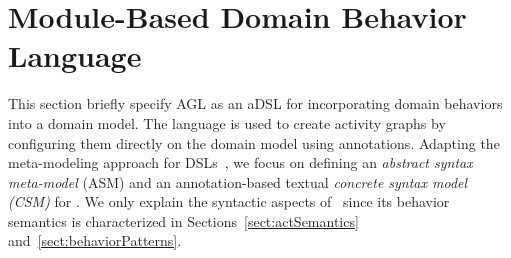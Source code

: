 \section{Module-Based Domain Behavior Language}
\label{sect:agl} 



This section briefly specify AGL as an aDSL for incorporating domain behaviors into a domain model. The language is used to create activity graphs by configuring them directly on the domain model using annotations. Adapting the meta-modeling approach for DSLs~\cite{kleppe_software_2008}, we focus on defining an \textit{abstract syntax meta-model} (ASM) and an annotation-based textual \textit{concrete syntax model (CSM)} for \agl. We only explain the syntactic aspects of \agl~since its behavior semantics is characterized in Sections~\ref{sect:actSemantics} and~\ref{sect:behaviorPatterns}.
%
